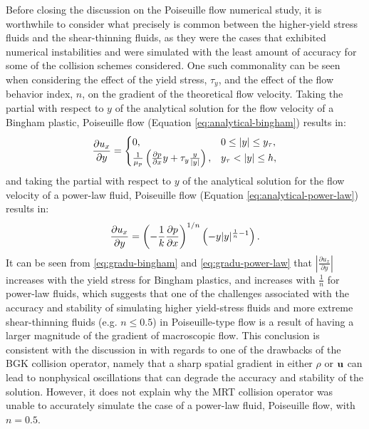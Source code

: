 Before closing the discussion on the Poiseuille flow numerical study, it is worthwhile to consider what precisely is common between the higher-yield stress fluids and the shear-thinning fluids, as they were the cases that exhibited numerical instabilities and were simulated with the least amount of accuracy for some of the collision schemes considered.
One such commonality can be seen when considering the effect of the yield stress, $\tau_y$, and the effect of the flow behavior index, $n$, on the gradient of the theoretical flow velocity.
Taking the partial with respect to $y$ of the analytical solution for the flow velocity of a Bingham plastic, Poiseuille flow (Equation \eqref{eq:analytical-bingham}) results in:
\begin{equation} \label{eq:gradu-bingham}
  \frac{\partial u_x}{\partial y} = \begin{cases}
    0, & 0 \leq |y| \leq y_{\tau}, \\
    \frac{1}{\mu_p} \left( \frac{\partial p}{\partial x} y + \tau_y \frac{y}{|y|} \right), & y_{\tau} < |y| \leq h,
  \end{cases}
\end{equation}
and taking the partial with respect to $y$ of the analytical solution for the flow velocity of a power-law fluid, Poiseuille flow (Equation \eqref{eq:analytical-power-law}) results in:
\begin{equation} \label{eq:gradu-power-law}
  \frac{\partial u_x}{\partial y} = \left( -\frac{1}{k} \frac{\partial p}{\partial x} \right)^{1/n} \left( -y |y|^{\frac{1}{n} - 1} \right).
\end{equation}
It can be seen from \eqref{eq:gradu-bingham} and \eqref{eq:gradu-power-law} that $\left| \frac{\partial u_x}{\partial y} \right|$ increases with the yield stress for Bingham plastics, and increases with $\frac{1}{n}$ for power-law fluids, which suggests that one of the challenges associated with the accuracy and stability of simulating higher yield-stress fluids and more extreme shear-thinning fluids (e.g. $n \le 0.5$) in Poiseuille-type flow is a result of having a larger magnitude of the gradient of macroscopic flow.
This conclusion is consistent with the discussion in  with regards to one of the drawbacks of the BGK collision operator, namely that a sharp spatial gradient in either $\rho$ or $\mathbf{u}$ can lead to nonphysical oscillations that can degrade the accuracy and stability of the solution.
However, it does not explain why the MRT collision operator was unable to accurately simulate the case of a power-law fluid, Poiseuille flow, with $n = 0.5$.

